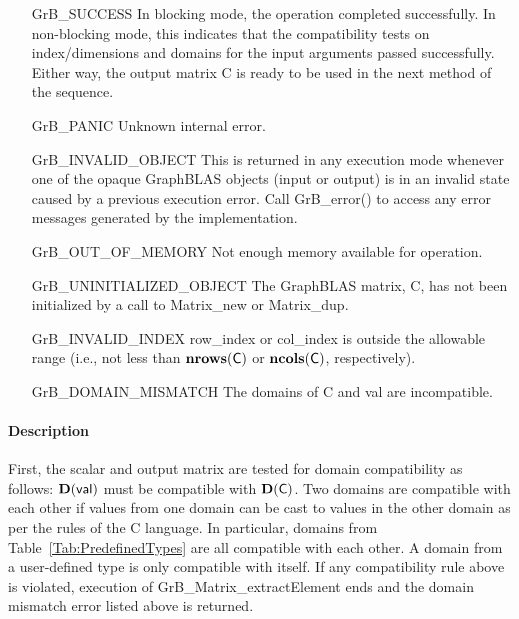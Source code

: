 \begin{itemize}[leftmargin=2.1in]
    \item[{\sf GrB\_SUCCESS}]         In blocking mode, the operation completed
    successfully. In non-blocking mode, this indicates that the compatibility 
    tests on index/dimensions and domains for the input arguments passed successfully. 
    Either way, the output matrix {\sf C} is ready to be used in the next method of 
    the sequence.

    \item[{\sf GrB\_PANIC}]   Unknown internal error.
    
    \item[{\sf GrB\_INVALID\_OBJECT}] This is returned in any execution mode 
    whenever one of the opaque GraphBLAS objects (input or output) is in an invalid 
    state caused by a previous execution error.  Call {\sf GrB\_error()} to access 
    any error messages generated by the implementation.

    \item[{\sf GrB\_OUT\_OF\_MEMORY}]  Not enough memory available for operation.
    
    \item[{\sf GrB\_UNINITIALIZED\_OBJECT}]  The GraphBLAS matrix, {\sf C}, has 
    not been initialized by a call to {\sf Matrix\_new} or {\sf Matrix\_dup}.

    \item[{\sf GrB\_INVALID\_INDEX}]  {\sf row\_index} or {\sf col\_index} is 
    outside the allowable range (i.e., not less than $\mathbf{nrows}({\sf C})$ or
    $\mathbf{ncols}({\sf C})$, respectively).

    \item[{\sf GrB\_DOMAIN\_MISMATCH}]     The domains of {\sf C} and {\sf val}
    are incompatible.
\end{itemize}

\paragraph{Description}

First, the scalar and output matrix are tested for domain compatibility as follows:  
$\mathbf{D}({\sf val})$ must be compatible with $\mathbf{D}({\sf C})$. Two domains 
are compatible with each other if values from one domain can be cast to values 
in the other domain as per the rules of the C language.  In particular, domains 
from Table~\ref{Tab:PredefinedTypes} are all compatible with each other. A domain 
from a user-defined type is only compatible with itself.  If any compatibility 
rule above is violated, execution of {\sf GrB\_Matrix\_extractElement} ends and
the domain mismatch error listed above is returned.

